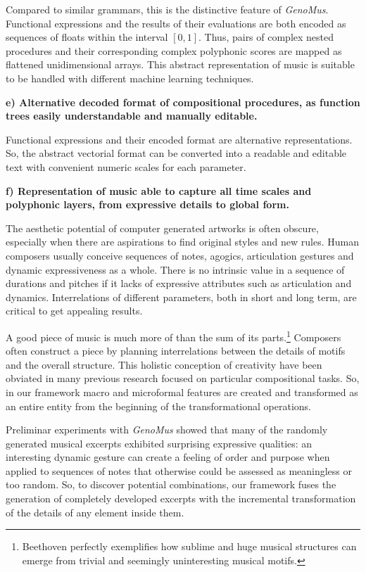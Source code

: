 \documentclass{article}
\begin{document}
Compared to similar grammars, this is the distinctive feature of \textsl{GenoMus}. Functional expressions and the results of their evaluations are both encoded as sequences of floats within the interval $[0, 1]$. Thus, pairs of complex nested procedures and their corresponding complex polyphonic scores are mapped as flattened unidimensional arrays. This abstract representation of music is suitable to be handled with different machine learning techniques. 

\textbf{e) Alternative decoded format of compositional procedures, as function trees easily understandable and manually editable.}

Functional expressions and their encoded format are alternative representations. So, the abstract vectorial format can be converted into a readable and editable text with convenient numeric scales for each parameter.

\textbf{f) Representation of music able to capture all time scales and polyphonic layers, from expressive details to global form.} 

The aesthetic potential of computer generated artworks is often obscure, especially when there are aspirations to find original styles and new rules. Human composers usually conceive sequences of notes, agogics, articulation gestures and dynamic expressiveness as a whole. There is no intrinsic value in a sequence of durations and pitches if it lacks of expressive attributes such as articulation and dynamics. Interrelations of different parameters, both in short and long term, are critical to get appealing results.

A good piece of music is much more of than the sum of its parts.\footnote{Beethoven perfectly exemplifies how sublime and huge musical structures can emerge from trivial and seemingly uninteresting musical motifs.} Composers often construct a piece by planning interrelations between the details of motifs and the overall structure. This holistic conception of creativity have been obviated in many previous research focused on particular compositional tasks. So, in our framework macro and microformal features are created and transformed as an entire entity from the beginning of the transformational operations.

Preliminar experiments with \textsl{GenoMus} showed that many of the randomly generated musical excerpts exhibited surprising expressive qualities: an interesting dynamic gesture can create a feeling of order and purpose when applied to sequences of notes that otherwise could be assessed as meaningless or too random. So, to discover potential combinations, our framework fuses the generation of completely developed excerpts with the incremental transformation of the details of any element inside them.
\end{document}
